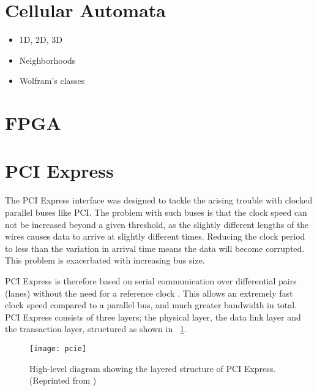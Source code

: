 \section{Cellular Automata}

\TODO

\begin{itemize}
    \item 1D, 2D, 3D
    \item Neighborhoods
    \item Wolfram's classes
\end{itemize}

\section{FPGA}

\TODO

\section{PCI Express}

The PCI Express interface was designed to tackle the arising trouble with clocked parallel buses like PCI.
The problem with such buses is that the clock speed can not be increased beyond a given threshold, as the slightly different lengths of the wires causes data to arrive at slightly different times.
Reducing the clock period to less than the variation in arrival time means the data will become corrupted.
This problem is exacerbated with increasing bus size.

PCI Express is therefore based on serial communication over differential pairs (lanes\footnotemark) without the need for a reference clock \cite{pcie}.
This allows an extremely fast clock speed compared to a parallel bus, and much greater bandwidth in total.
PCI Express consists of three layers; the physical layer, the data link layer and the transaction layer, structured as shown in \figurename~\ref{fig:pcie}.

\begin{figure}[!ht]
    \centering
    \texttt{[image: pcie]}
    \caption{High-level diagram showing the layered structure of PCI Express. (Reprinted from \cite{pcie})}
    \label{fig:pcie}
\end{figure}

